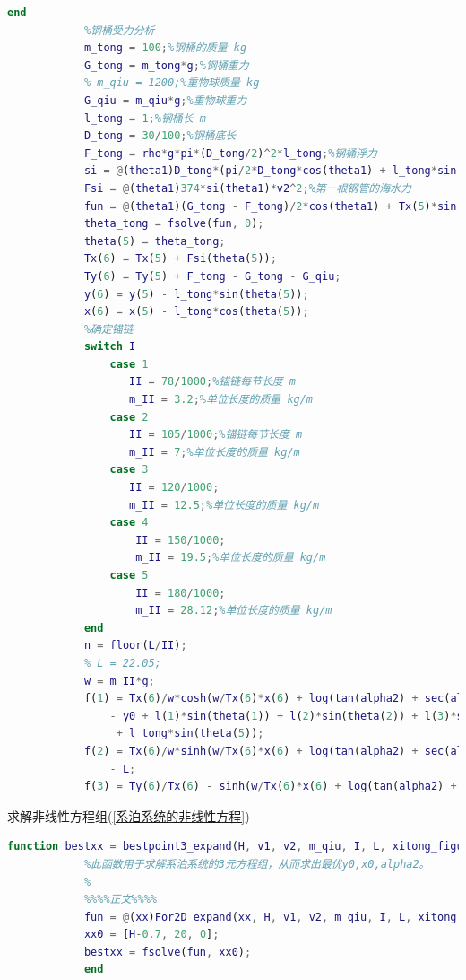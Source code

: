 \documentclass[UTF8]{ctexbook}
\theoremstyle{nonumberplain}
\begin{document}
\begin{lstlisting}[language = Matlab]
            end
            %钢桶受力分析
            m_tong = 100;%钢桶的质量 kg
            G_tong = m_tong*g;%钢桶重力
            % m_qiu = 1200;%重物球质量 kg
            G_qiu = m_qiu*g;%重物球重力
            l_tong = 1;%钢桶长 m
            D_tong = 30/100;%钢桶底长
            F_tong = rho*g*pi*(D_tong/2)^2*l_tong;%钢桶浮力
            si = @(theta1)D_tong*(pi/2*D_tong*cos(theta1) + l_tong*sin(theta1));%第一根钢管的海水法平面投影
            Fsi = @(theta1)374*si(theta1)*v2^2;%第一根钢管的海水力
            fun = @(theta1)(G_tong - F_tong)/2*cos(theta1) + Tx(5)*sin(theta1) + Fsi(theta1)*sin(theta1)/2 - Ty(5)*cos(theta1);
            theta_tong = fsolve(fun, 0);
            theta(5) = theta_tong;
            Tx(6) = Tx(5) + Fsi(theta(5));
            Ty(6) = Ty(5) + F_tong - G_tong - G_qiu;
            y(6) = y(5) - l_tong*sin(theta(5));
            x(6) = x(5) - l_tong*cos(theta(5));
            %确定锚链
            switch I
                case 1
                   II = 78/1000;%锚链每节长度 m
                   m_II = 3.2;%单位长度的质量 kg/m
                case 2
                   II = 105/1000;%锚链每节长度 m
                   m_II = 7;%单位长度的质量 kg/m
                case 3
                   II = 120/1000;
                   m_II = 12.5;%单位长度的质量 kg/m
                case 4
                    II = 150/1000;
                    m_II = 19.5;%单位长度的质量 kg/m
                case 5
                    II = 180/1000;
                    m_II = 28.12;%单位长度的质量 kg/m
            end
            n = floor(L/II);
            % L = 22.05;
            w = m_II*g;
            f(1) = Tx(6)/w*cosh(w/Tx(6)*x(6) + log(tan(alpha2) + sec(alpha2))) - Tx(6)/w*sec(alpha2)...
                - y0 + l(1)*sin(theta(1)) + l(2)*sin(theta(2)) + l(3)*sin(theta(3)) + l(4)*sin(theta(4))...
                 + l_tong*sin(theta(5));
            f(2) = Tx(6)/w*sinh(w/Tx(6)*x(6) + log(tan(alpha2) + sec(alpha2))) - Tx(6)/w*tan(alpha2)...
                - L;
            f(3) = Ty(6)/Tx(6) - sinh(w/Tx(6)*x(6) + log(tan(alpha2) + sec(alpha2)));
            \end{lstlisting}
            求解非线性方程组(\ref{系泊系统的非线性方程})
            \begin{lstlisting}[language = Matlab]
            function bestxx = bestpoint3_expand(H, v1, v2, m_qiu, I, L, xitong_figure, xitong_save)
            %此函数用于求解系泊系统的3元方程组，从而求出最优y0,x0,alpha2。
            %
            %%%%正文%%%%
            fun = @(xx)For2D_expand(xx, H, v1, v2, m_qiu, I, L, xitong_figure, xitong_save);
            xx0 = [H-0.7, 20, 0];
            bestxx = fsolve(fun, xx0);
            end
            \end{lstlisting}
\end{document}
